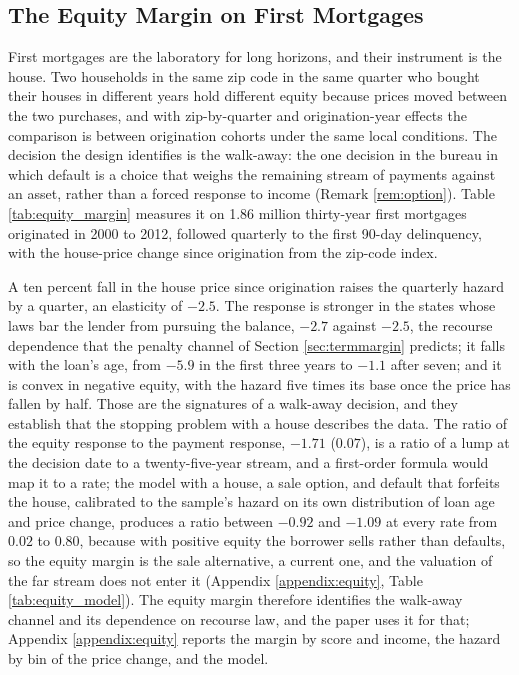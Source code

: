 \subsection{The Equity Margin on First Mortgages}\label{sec:equity}

First mortgages are the laboratory for long horizons, and their instrument is the house. Two households in the same zip code in the same quarter who bought their houses in different years hold different equity because prices moved between the two purchases, and with zip-by-quarter and origination-year effects the comparison is between origination cohorts under the same local conditions. The decision the design identifies is the walk-away: the one decision in the bureau in which default is a choice that weighs the remaining stream of payments against an asset, rather than a forced response to income (Remark \ref{rem:option}). Table \ref{tab:equity_margin} measures it on 1.86 million thirty-year first mortgages originated in 2000 to 2012, followed quarterly to the first 90-day delinquency, with the house-price change since origination from the zip-code index.

A ten percent fall in the house price since origination raises the quarterly hazard by a quarter, an elasticity of $-2.5$. The response is stronger in the states whose laws bar the lender from pursuing the balance, $-2.7$ against $-2.5$, the recourse dependence that the penalty channel of Section \ref{sec:termmargin} predicts; it falls with the loan's age, from $-5.9$ in the first three years to $-1.1$ after seven; and it is convex in negative equity, with the hazard five times its base once the price has fallen by half. Those are the signatures of a walk-away decision, and they establish that the stopping problem with a house describes the data. The ratio of the equity response to the payment response, $-1.71$ ($0.07$), is a ratio of a lump at the decision date to a twenty-five-year stream, and a first-order formula would map it to a rate; the model with a house, a sale option, and default that forfeits the house, calibrated to the sample's hazard on its own distribution of loan age and price change, produces a ratio between $-0.92$ and $-1.09$ at every rate from $0.02$ to $0.80$, because with positive equity the borrower sells rather than defaults, so the equity margin is the sale alternative, a current one, and the valuation of the far stream does not enter it (Appendix \ref{appendix:equity}, Table \ref{tab:equity_model}). The equity margin therefore identifies the walk-away channel and its dependence on recourse law, and the paper uses it for that; Appendix \ref{appendix:equity} reports the margin by score and income, the hazard by bin of the price change, and the model.


